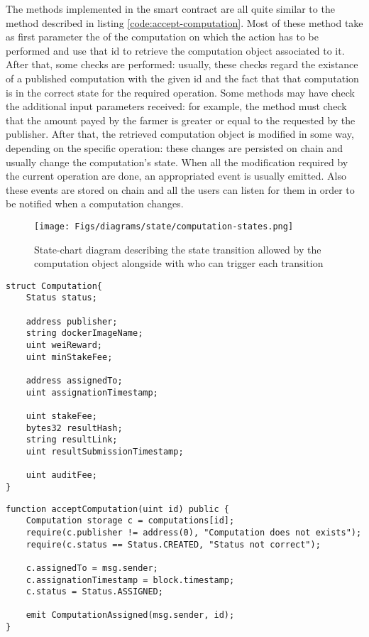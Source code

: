 The methods implemented in the smart contract are all quite similar to the  method described in listing \ref{code:accept-computation}. Most of these method take as first parameter the  of the computation on which the action has to be performed and use that id to retrieve the computation object associated to it. After that, some checks are performed: usually, these checks regard the existance of a published computation with the given id and the fact that that computation is in the correct state for the required operation. Some methods may have check the additional input parameters received: for example, the  method must check that the amount payed by the farmer is greater or equal to the  requested by the publisher. After that, the retrieved computation object is modified in some way, depending on the specific operation: these changes are persisted on chain and usually change the computation's state. When all the modification required by the current operation are done, an appropriated event is usually emitted. Also these events are stored on chain and all the users can listen for them in order to be notified when a computation changes.

\begin{figure}
\caption[Computation object state machine]{State-chart diagram describing the state transition allowed by the computation object alongside with who can trigger each transition}
\label{figs:computation-states}
\begin{center}
    \texttt{[image: Figs/diagrams/state/computation-states.png]}
\end{center}
\end{figure}

\begin{lstlisting}[caption={Definition of the structure that describes the computation object}, label={code:computation-structure}, float]
struct Computation{ 
    Status status;

    address publisher;
    string dockerImageName; 
    uint weiReward;
    uint minStakeFee;

    address assignedTo;
    uint assignationTimestamp;

    uint stakeFee;
    bytes32 resultHash;
    string resultLink;
    uint resultSubmissionTimestamp;

    uint auditFee;
}
\end{lstlisting}

\begin{lstlisting}[caption={The method that allows a farmer to ask for the assignation of a computation}, label={code:accept-computation}, float]
function acceptComputation(uint id) public {
    Computation storage c = computations[id];
    require(c.publisher != address(0), "Computation does not exists");
    require(c.status == Status.CREATED, "Status not correct");

    c.assignedTo = msg.sender;
    c.assignationTimestamp = block.timestamp;
    c.status = Status.ASSIGNED;

    emit ComputationAssigned(msg.sender, id);
}
\end{lstlisting}

